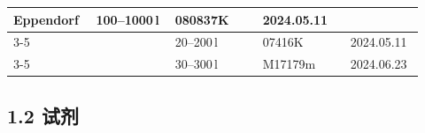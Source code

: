 \documentclass[UTF8,10pt,a4paper,fontset=fandol]{ctexart}
\newcommand{\fieldvalue}[1]{#1}
\newcommand{\handwritten}[1]{#1}
\begin{document}
\begin{center}
\begin{tabular}{|p{0.18\linewidth}|p{0.18\linewidth}|p{0.20\linewidth}|p{0.20\linewidth}|p{0.16\linewidth}|}
{%
\fieldvalue{Eppendorf}} &
\fieldvalue{\handwritten{100--1000\,\textmu l}} &
\fieldvalue{\handwritten{080837K}} &
\fieldvalue{\handwritten{2024.05.11}}\\
\cline{3-5}
&
&
\fieldvalue{\handwritten{20--200\,\textmu l}} &
\fieldvalue{\handwritten{07416K}} &
\fieldvalue{\handwritten{2024.05.11}}\\
\cline{3-5}
&
&
\fieldvalue{\handwritten{30--300\,\textmu l}} &
\fieldvalue{\handwritten{M17179m}} &
\fieldvalue{\handwritten{2024.06.23}}\\
\hline
\end{tabular}
\end{center}

\subsection*{1.2 试剂}
\end{document}
